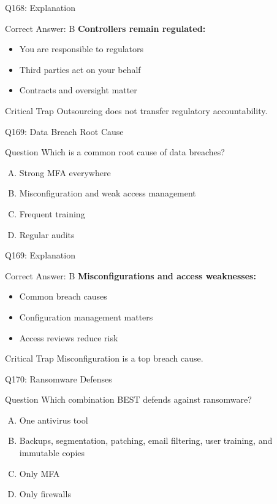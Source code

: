 \documentclass{beamer}
\begin{document}
	\begin{frame}{Q168: Explanation}
		\begin{block}{Correct Answer: B}
			\textbf{Controllers remain regulated:}
			\begin{itemize}
				\item You are responsible to regulators
				\item Third parties act on your behalf
				\item Contracts and oversight matter
			\end{itemize}
		\end{block}
		\begin{alertblock}{Critical Trap}
			Outsourcing does not transfer regulatory accountability.
		\end{alertblock}
	\end{frame}
	
	\begin{frame}{Q169: Data Breach Root Cause}
		\begin{block}{Question}
			Which is a common root cause of data breaches?
		\end{block}
		\begin{enumerate}[(A)]
			\item Strong MFA everywhere
			\item Misconfiguration and weak access management
			\item Frequent training
			\item Regular audits
		\end{enumerate}
	\end{frame}
	
	\begin{frame}{Q169: Explanation}
		\begin{block}{Correct Answer: B}
			\textbf{Misconfigurations and access weaknesses:}
			\begin{itemize}
				\item Common breach causes
				\item Configuration management matters
				\item Access reviews reduce risk
			\end{itemize}
		\end{block}
		\begin{alertblock}{Critical Trap}
			Misconfiguration is a top breach cause.
		\end{alertblock}
	\end{frame}
	
	\begin{frame}{Q170: Ransomware Defenses}
		\begin{block}{Question}
			Which combination BEST defends against ransomware?
		\end{block}
		\begin{enumerate}[(A)]
			\item One antivirus tool
			\item Backups, segmentation, patching, email filtering, user training, and immutable copies
			\item Only MFA
			\item Only firewalls
		\end{enumerate}
	\end{frame}
	
\end{document}
